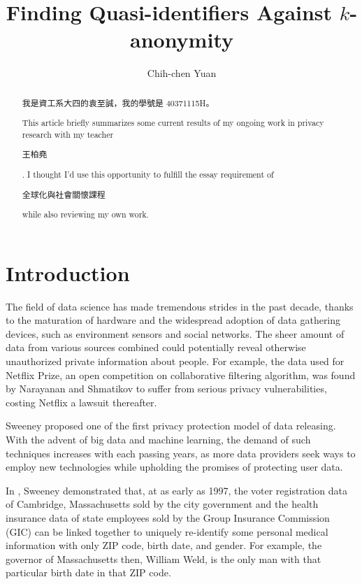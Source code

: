 \documentclass[12pt]{llncs}
\title{Finding Quasi-identifiers Against $k$-anonymity}
\author{Chih-chen Yuan}
\institute{National Taiwan Normal University, Taiwan}
\begin{document}
\maketitle

\begin{abstract}
\begin{CJK}{UTF8}{bsmi}我是資工系大四的袁至誠，我的學號是 40371115H。\end{CJK}This article briefly summarizes some current results of my ongoing work in privacy research with my teacher \begin{CJK}{UTF8}{bsmi}王柏堯\end{CJK}. I thought I'd use this opportunity to fulfill the essay requirement of \begin{CJK}{UTF8}{bsmi}全球化與社會關懷課程\end{CJK} while also reviewing my own work.
\end{abstract}

\section{Introduction}
The field of data science has made tremendous strides in the past decade, thanks to the maturation of hardware and the widespread adoption of data gathering devices, such as environment sensors and social networks. The sheer amount of data from various sources combined could potentially reveal otherwise unauthorized private information about people. For example, the data used for Netflix Prize, an open competition on collaborative filtering algorithm, was found by Narayanan and Shmatikov \cite{Narayanan:2008} to suffer from serious privacy vulnerabilities, costing Netflix a lawsuit thereafter.

Sweeney \cite{Sweeney:2002} proposed one of the first privacy protection model of data releasing. With the advent of big data and machine learning, the demand of such techniques increases with each passing years, as more data providers seek ways to employ new technologies while upholding the promises of protecting user data.

In \cite{Sweeney:2002}, Sweeney demonstrated that, at as early as 1997, the voter registration data of Cambridge, Massachusetts sold by the city government and the health insurance data of state employees sold by the Group Insurance Commission (GIC) can be linked together to uniquely re-identify some personal medical information with only ZIP code, birth date, and gender. For example, the governor of Massachusetts then, William Weld, is the only man with that particular birth date in that ZIP code.
\end{document}
